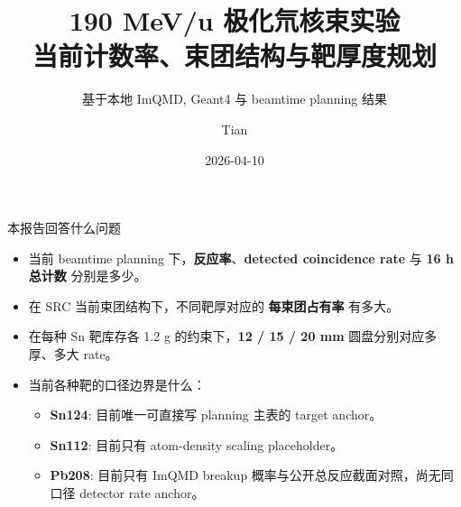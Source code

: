 \documentclass[aspectratio=169]{ctexbeamer}
\title[190 MeV/u d on Sn/Pb]{190 MeV/u 极化氘核束实验\\当前计数率、束团结构与靶厚度规划}
\subtitle{基于本地 ImQMD, Geant4 与 beamtime planning 结果}
\author{Tian }
\date{2026-04-10}
\begin{document}
\begin{frame}
\titlepage
\end{frame}

\begin{frame}{本报告回答什么问题}
\begin{itemize}
  \item 当前 beamtime planning 下，\textbf{反应率}、\textbf{detected coincidence rate} 与 \textbf{16 h 总计数} 分别是多少。
  \item 在 SRC 当前束团结构下，不同靶厚对应的 \textbf{每束团占有率} 有多大。
  \item 在每种 Sn 靶库存各 1.2 g 的约束下，\textbf{12 / 15 / 20 mm} 圆盘分别对应多厚、多大 rate。
  \item 当前各种靶的口径边界是什么：
  \begin{itemize}
    \item \textbf{Sn124}: 目前唯一可直接写 planning 主表的 target anchor。
    \item \textbf{Sn112}: 目前只有 atom-density scaling placeholder。
    \item \textbf{Pb208}: 目前只有 ImQMD breakup 概率与公开总反应截面对照，尚无同口径 detector rate anchor。
  \end{itemize}
\end{itemize}
\end{frame}
\end{document}

